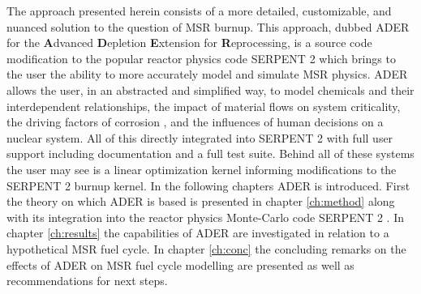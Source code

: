 The approach presented herein consists of a more detailed, customizable, and
nuanced solution to the question of MSR burnup. This approach, dubbed ADER for
the \textbf{A}dvanced \textbf{D}epletion \textbf{E}xtension for 
\textbf{R}eprocessing, is a source code modification to the popular reactor
physics code SERPENT 2 which brings to the user the ability to more accurately
model and simulate MSR physics. ADER allows the user, in an abstracted and
simplified way, to model chemicals and their interdependent relationships, the
impact of material flows on system criticality, the driving factors of corrosion
, and the influences of human decisions on a nuclear system. All of this
directly integrated into SERPENT 2 with full user support including
documentation and a full test suite. Behind all of these systems the user may
see is a linear optimization kernel informing modifications to the SERPENT 2
burnup kernel.  In the following chapters ADER is introduced. First the theory 
on which ADER is based is
presented in chapter \ref{ch:method} along with its integration into the reactor
physics Monte-Carlo code SERPENT 2 \cite{Jaakko}. In chapter
\ref{ch:results} the capabilities of ADER are investigated in relation to a
hypothetical MSR fuel cycle. In chapter \ref{ch:conc} the concluding remarks
on the effects of ADER on
MSR fuel cycle modelling are presented as well as recommendations for next
steps. 
